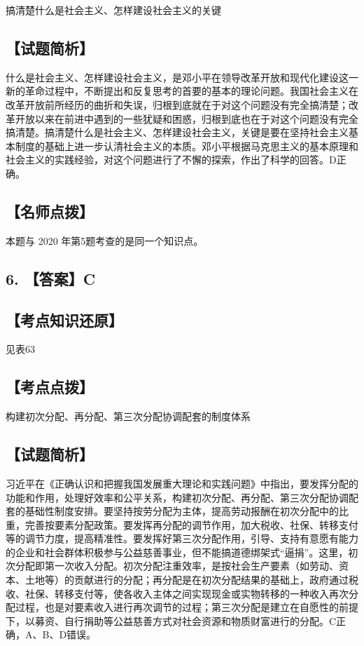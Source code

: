 \documentclass[UTF8,11pt]{ctexart}
\begin{document}
搞清楚什么是社会主义、怎样建设社会主义的关键


\subsection*{【试题简析】}

什么是社会主义、怎样建设社会主义，是邓小平在领导改革开放和现代化建设这一新的革命过程中，不断提出和反复思考的首要的基本的理论问题。我国社会主义在改革开放前所经历的曲折和失误，归根到底就在于对这个问题没有完全搞清楚；改革开放以来在前进中遇到的一些犹疑和困惑，归根到底也在于对这个问题没有完全搞清楚。搞清楚什么是社会主义、怎样建设社会主义，关键是要在坚持社会主义基本制度的基础上进一步认清社会主义的本质。邓小平根据马克思主义的基本原理和社会主义的实践经验，对这个问题进行了不懈的探索，作出了科学的回答。D正确。


\subsection*{【名师点拨】}

本题与 2020 年第5题考查的是同一个知识点。


\subsection*{6. 【答案】C}

\subsection*{【考点知识还原】}

见表63


\subsection*{【考点点拨】}

构建初次分配、再分配、第三次分配协调配套的制度体系


\subsection*{【试题简析】}

习近平在《正确认识和把握我国发展重大理论和实践问题》中指出，要发挥分配的功能和作用，处理好效率和公平关系，构建初次分配、再分配、第三次分配协调配套的基础性制度安排。要坚持按劳分配为主体，提高劳动报酬在初次分配中的比重，完善按要素分配政策。要发挥再分配的调节作用，加大税收、社保、转移支付等的调节力度，提高精准性。要发挥好第三次分配作用，引导、支持有意愿有能力的企业和社会群体积极参与公益慈善事业，但不能搞道德绑架式“逼捐”。这里，初次分配即第一次收入分配。初次分配注重效率，是按社会生产要素（如劳动、资本、土地等）的贡献进行的分配；再分配是在初次分配结果的基础上，政府通过税收、社保、转移支付等，使各收入主体之间实现现金或实物转移的一种收入再次分配过程，也是对要素收入进行再次调节的过程；第三次分配是建立在自愿性的前提下，以募资、自行捐助等公益慈善方式对社会资源和物质财富进行的分配。C正确，A、B、D错误。
\end{document}
